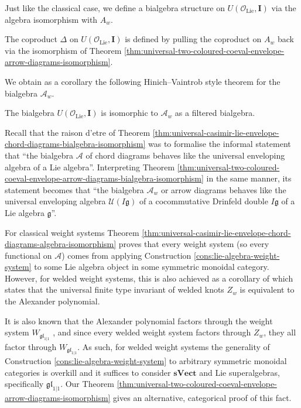 Just like the classical case, we define a bialgebra structure on \(U(\mathcal{O}_{\text{Lie}}, \mathbf{I})\) via the algebra isomorphism with \(A_{w}\).

\begin{definition}
	The coproduct \(\Delta\) on \(U(\mathcal{O}_{\text{Lie}}, \mathbf{I})\) is defined by pulling the coproduct on \(A_{w}\) back via the isomorphism of Theorem \ref{thm:universal-two-coloured-coeval-envelope-arrow-diagrams-isomorphism}.
\end{definition}

We obtain as a corollary the following Hinich--Vaintrob style theorem for the bialgebra \(\mathcal{A}_{w}\).

\begin{theorem}
	\label{thm:universal-two-coloured-coeval-envelope-arrow-diagrams-bialgebra-isomorphism}
	The bialgebra \(U(\mathcal{O}_{\text{Lie}}, \mathbf{I})\) is isomorphic to \(\mathcal{A}_{w}\) as a filtered bialgebra.
\end{theorem}

Recall that the raison d'etre of Theorem \ref{thm:universal-casimir-lie-envelope-chord-diagrams-bialgebra-isomorphism} was to formalise the informal statement that ``the bialgebra \(\mathcal{A}\) of chord diagrams behaves like the universal enveloping algebra of a Lie algebra''. Interpreting Theorem \ref{thm:universal-two-coloured-coeval-envelope-arrow-diagrams-bialgebra-isomorphism} in the same manner, its statement becomes that ``the bialgebra \(\mathcal{A}_{w}\) or arrow diagrams behaves like the universal enveloping algebra \(\mathcal{U}(I\mathfrak{g})\) of a cocommutative Drinfeld double \(I\mathfrak{g}\) of a Lie algebra \(\mathfrak{g}\)''.

\begin{remark}
	For classical weight systems Theorem \ref{thm:universal-casimir-lie-envelope-chord-diagrams-algebra-isomorphism} proves that every weight system (so every functional on \(\mathcal{A}\)) comes from applying Construction \ref{cons:lie-algebra-weight-system} to some Lie algebra object in some symmetric monoidal category. However, for welded weight systems, this is also achieved as a corollary of \cite[Thm. 3.26]{finite-type-invariants-of-w-knotted-objects-I-w-knots-and-the-alexander-polynomial} which states that the universal finite type invariant of welded knots \(Z_{w}\) is equivalent to the Alexander polynomial.

	It is also known that the Alexander polynomial factors through the weight system \(W_{\mathfrak{gl}_{1|1}}\) \cite{the-universal-vassiliev-invariant-for-the-lie-superalgebra-gl1-1}, and since every welded weight system factors through \(Z_{w}\), they all factor through \(W_{\mathfrak{gl}_{1|1}}\). As such, for welded weight systems the generality of Construction \ref{cons:lie-algebra-weight-system} to arbitrary symmetric monoidal categories is overkill and it suffices to consider \(\mathbf{sVect}\) and Lie superalgebras, specifically \(\mathfrak{gl}_{1|1}\). Our Theorem \ref{thm:universal-two-coloured-coeval-envelope-arrow-diagrams-isomorphism} gives an alternative, categorical proof of this fact.
\end{remark}

